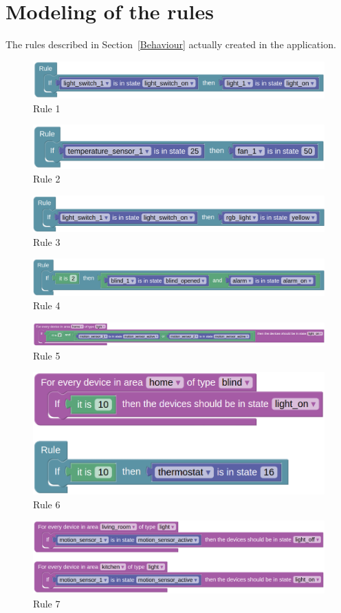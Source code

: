 \documentclass[11pt,a4paper]{report}
\begin{document}
\section{Modeling of the rules}
\label{appendix:rules}
The rules described in Section~\ref{Behaviour} actually created in the application.
\begin{figure}[h!]
    \centering
    \includegraphics[width=0.8\linewidth]{images/R1.png}
    \caption{Rule 1}
\end{figure}
\begin{figure}[h!]
    \centering
    \includegraphics[width=0.8\linewidth]{images/R2.png}
    \caption{Rule 2}
\end{figure}
\begin{figure}[h!]
    \centering
    \includegraphics[width=0.8\linewidth]{images/R3.png}
    \caption{Rule 3}
\end{figure}
\begin{figure}[h!]
    \centering
    \includegraphics[width=0.8\linewidth]{images/R4.png}
    \caption{Rule 4}
\end{figure}
\begin{figure}[h!]
    \centering
    \includegraphics[width=0.8\linewidth]{images/R5.png}
    \caption{Rule 5}
\end{figure}
\begin{figure}[h!]
    \centering
    \includegraphics[width=0.6\linewidth]{images/R6.png}
    \caption{Rule 6}
\end{figure}
\begin{figure}[h!]
    \centering
    \includegraphics[width=0.8\linewidth]{images/R7.png}
    \caption{Rule 7}
\end{figure}
\end{document}
